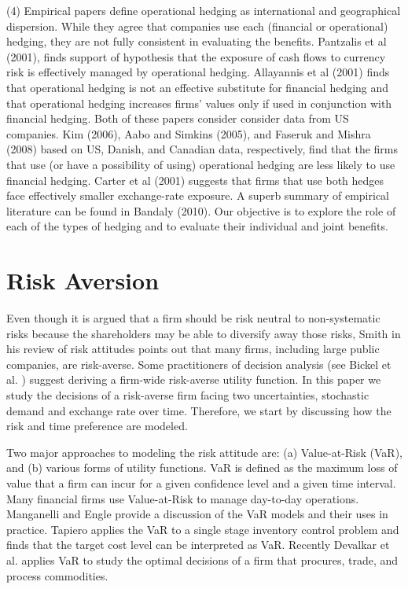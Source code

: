 \documentclass[mnsc,nonblindrev,copyedit]{informs2_wz} %
\begin{document}
(4) Empirical papers define operational hedging as international and geographical dispersion.  While they agree that companies use each (financial or operational) hedging, they are not fully consistent in evaluating the benefits.   
Pantzalis et al (2001), finds support of hypothesis that the exposure of cash flows to currency risk is effectively managed by operational hedging.
Allayannis et al (2001) finds that operational hedging is not an effective substitute for financial hedging and that operational hedging increases firms' values only if used in conjunction with financial hedging.  Both of these papers consider consider data from US companies. 
Kim (2006), Aabo and Simkins (2005), and Faseruk and Mishra (2008) based on US, Danish, and Canadian data, respectively, find that the firms that use (or have a possibility of using) operational hedging are less likely to use financial hedging. Carter et al (2001) suggests that firms that use both hedges face effectively smaller exchange-rate exposure.  A superb summary of empirical literature can be found in Bandaly (2010).  Our objective is to explore the role of each of the types of hedging and to evaluate their individual and joint benefits.





\section{Risk Aversion}

Even though it is argued that a firm should be risk neutral to non-systematic risks because the shareholders may be able to diversify away those risks, Smith \cite{Smith2004} in his review of risk attitudes points out that many firms, including large public companies, are risk-averse.  Some practitioners of decision analysis (see Bickel et al.  \cite{Bickel2002}) suggest deriving a firm-wide risk-averse utility function.  In this paper we study the decisions of a risk-averse firm facing two uncertainties, stochastic demand and exchange rate over time.  
Therefore, we start by discussing how the risk and time preference are modeled.

Two major approaches to modeling the risk attitude are: (a) Value-at-Risk (VaR), and (b) various forms of utility functions.  VaR is defined as the maximum loss of value that a firm can incur for a given confidence level and a given time interval.  Many financial firms use Value-at-Risk to manage day-to-day operations.  Manganelli and Engle \cite{Manganelli2001} provide a discussion of the VaR models and their uses in practice. Tapiero \cite{tapiero_value_2005} applies the VaR to a single stage inventory control problem and finds that the target cost level can be interpreted as VaR.  Recently Devalkar et al. \cite{devalkar_integrated_2010} applies VaR to study the optimal decisions of a firm that procures, trade, and process commodities.
\end{document}
